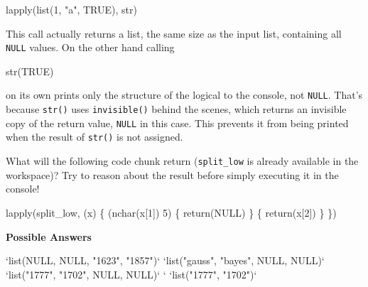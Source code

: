 \documentclass[]{article}
\newcommand{\hlnum}[1]{\textcolor[rgb]{0.816,0.125,0.439}{#1}}%
\newcommand{\hlstr}[1]{\textcolor[rgb]{0.251,0.627,0.251}{#1}}%
\newcommand{\hlstd}[1]{\textcolor[rgb]{0.251,0.251,0.251}{#1}}%
\newcommand{\hlkwc}[1]{\textcolor[rgb]{0.251,0.251,0.251}{#1}}%
\newcommand{\hlkwd}[1]{\textcolor[rgb]{0.878,0.439,0.125}{#1}}%
\newenvironment{Shaded}{\begin{myshaded}}{\end{myshaded}}
\newcommand{\KeywordTok}[1]{\hlkwd{#1}}
\newcommand{\DataTypeTok}[1]{\hlkwc{#1}}
\newcommand{\DecValTok}[1]{\hlnum{#1}}
\newcommand{\StringTok}[1]{\hlstr{#1}}
\newcommand{\OtherTok}[1]{{#1}}
\newcommand{\NormalTok}[1]{\hlstd{#1}}
\begin{document}
\begin{Shaded}
\begin{Highlighting}[]
\KeywordTok{lapply}\NormalTok{(}\KeywordTok{list}\NormalTok{(}\DecValTok{1}\NormalTok{, }\StringTok{"a"}\NormalTok{, }\OtherTok{TRUE}\NormalTok{), str)}
\end{Highlighting}
\end{Shaded}

This call actually returns a list, the same size as the input list,
containing all \texttt{NULL} values. On the other hand calling

\begin{Shaded}
\begin{Highlighting}[]
\KeywordTok{str}\NormalTok{(}\OtherTok{TRUE}\NormalTok{)}
\end{Highlighting}
\end{Shaded}

on its own prints only the structure of the logical to the console, not
\texttt{NULL}. That's because \texttt{str()} uses \texttt{invisible()}
behind the scenes, which returns an invisible copy of the return value,
\texttt{NULL} in this case. This prevents it from being printed when the
result of \texttt{str()} is not assigned.

What will the following code chunk return (\texttt{split\_low} is
already available in the workspace)? Try to reason about the result
before simply executing it in the console!

\begin{Shaded}
\begin{Highlighting}[]
\KeywordTok{lapply}\NormalTok{(split_low, }\NormalTok{(x) \{}
  \NormalTok{ (}\KeywordTok{nchar}\NormalTok{(x[}\DecValTok{1}\NormalTok{]) }\OperatorTok{>}\StringTok{ }\DecValTok{5}\NormalTok{) \{}
    \KeywordTok{return}\NormalTok{(}\OtherTok{NULL}\NormalTok{)}
\NormalTok{  \} }\NormalTok{ \{}
    \KeywordTok{return}\NormalTok{(x[}\DecValTok{2}\NormalTok{])}
\NormalTok{  \}}
\NormalTok{\})}
\end{Highlighting}
\end{Shaded}

\textbf{Possible Answers}

\begin{Shaded}
\begin{Highlighting}[]
\OperatorTok{*}\StringTok{ `}\DataTypeTok{list(NULL, NULL, "1623", "1857")}\StringTok{`}
\OperatorTok{*}\StringTok{ `}\DataTypeTok{list("gauss", "bayes", NULL, NULL)}\StringTok{`}
\OperatorTok{*}\StringTok{ `}\DataTypeTok{list("1777", "1702", NULL, NULL)}\StringTok{`}
\StringTok{`}\DataTypeTok{ }\StringTok{`}\KeywordTok{list}\NormalTok{(}\StringTok{"1777"}\NormalTok{, }\StringTok{"1702"}\NormalTok{)}\StringTok{`}
\end{Highlighting}
\end{Shaded}
\end{document}
